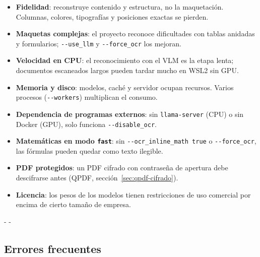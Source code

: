 \documentclass[11pt,a4paper]{article}
\makeatletter
\newcommand{\necesitaespacio}[1]{\par\penalty-100\begingroup
	\setlength{\dimen@}{#1}\dimen@ii\pagegoal\advance\dimen@ii-\pagetotal
	\ifdim\dimen@>\dimen@ii\ifdim\dimen@ii>\z@\vfil\fi\penalty-\@M\fi\endgroup}
\newcommand{\cmd}[1]{\texttt{\textcolor{colcmd}{#1}}}      %
\newcommand{\opt}[1]{\texttt{\textcolor{colopt}{#1}}}      %
\newcommand{\val}[1]{\texttt{#1}}                          %
\makeatother
\begin{document}
	\begin{limitacion}
		\begin{itemize}
			\item \textbf{Fidelidad}: reconstruye contenido y estructura, no la maquetación. Columnas, colores, tipografías y posiciones exactas se pierden.
			\item \textbf{Maquetas complejas}: el proyecto reconoce dificultades con tablas anidadas y formularios; \opt{-{}-use\_llm} y \opt{-{}-force\_ocr} los mejoran.
			\item \textbf{Velocidad en CPU}: el reconocimiento con el VLM es la etapa lenta; documentos escaneados largos pueden tardar mucho en WSL2 sin GPU.
			\item \textbf{Memoria y disco}: modelos, caché y servidor ocupan recursos. Varios procesos (\opt{-{}-workers}) multiplican el consumo.
			\item \textbf{Dependencia de programas externos}: sin \cmd{llama-server} (CPU) o sin Docker (GPU), solo funciona \opt{-{}-disable\_ocr}.
			\item \textbf{Matemáticas en modo \val{fast}}: sin \opt{-{}-ocr\_\allowbreak{}inline\_\allowbreak{}math true} o \opt{-{}-force\_ocr}, las fórmulas pueden quedar como texto ilegible.
			\item \textbf{PDF protegidos}: un PDF cifrado con contraseña de apertura debe descifrarse antes (QPDF, sección~\ref{sec:qpdf-cifrado}).
			\item \textbf{Licencia}: los pesos de los modelos tienen restricciones de uso comercial por encima de cierto tamaño de empresa.
		\end{itemize}
	\end{limitacion}
	
	\necesitaespacio{14\baselineskip}
	\subsection{Errores frecuentes}
	
\end{document}
